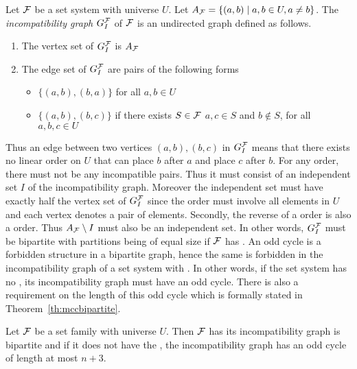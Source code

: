 \begin{definition}
  \label{def:incompatibility}
  Let ${\cal F}$ be a set system with universe $U$. Let $A_{{\cal F}} = \{(a,b)
  \mid a, b \in U, a \ne b\}$. The {\em incompatibility graph}
  $G_I^{\cal F}$ of ${\cal F}$ is an undirected graph defined as follows.
  \begin{enumerate}
  \item   The vertex set of $G_I^{\cal F}$ is $ A_{{\cal F}}$
  \item  The edge set of $G_I^{\cal F}$ are pairs of the following forms
    \begin{itemize}
    \item $\{(a,b),(b,a)\}$ for all $a, b \in U$
    \item $\{(a,b),(b,c)\}$ if there exists $S \in {\cal F}$ \stt $a, c
      \in S$ and $b \notin S$, for all $a, b, c \in U$
    \end{itemize}
  \end{enumerate}
  \dstop
\end{definition}

Thus an edge between two vertices $(a,b), (b,c)$ in $G_I^{{\cal F}}$ means
that there exists no linear order on $U$ that can place $b$ after $a$
and place $c$ after $b$.  For any \COP order, there must not be any
incompatible pairs. Thus it must consist of an independent set $I$ of
the incompatibility graph. Moreover the independent set must have
exactly half the vertex set of $G_I^{\cal F}$ since the \COP order must
involve all elements in $U$ and each vertex denotes a pair of elements. Secondly, the reverse of a \COP order is
also a \COP order. Thus $A_{\cal F} \setminus I$ must also be an
independent set. In other words, $G_I^{\cal F}$ must be bipartite with
partitions being of equal size if ${\cal F}$ has \COP. An odd cycle is a
forbidden structure in a bipartite graph, hence the same is forbidden
in the incompatibility graph of a set system with \COP. In other
words, if the set system has no \COP, its incompatibility graph must
have an odd cycle.  There is also a requirement on the length of this
odd cycle which is formally stated in Theorem~\ref{th:mccbipartite}.

\begin{theoremsansproof} 
  \label{th:mccbipartite}
  Let ${\cal F}$ be a set family with universe $U$. Then ${\cal F}$ has \COP
  \iff its incompatibility graph is bipartite and if it does not have
  the \COP, the incompatibility graph has an odd cycle of length at
  most $n+3$.
\end{theoremsansproof}

